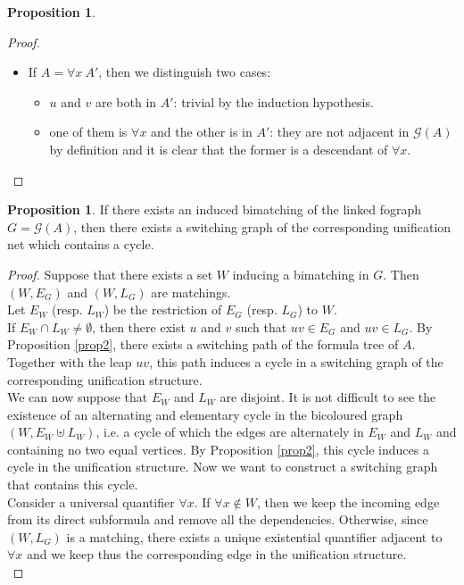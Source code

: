 \documentclass[conference,twosided,10pt]{IEEEtran}
\theoremstyle{definition}
\newtheorem{proposition}[thm]{Proposition}
\newcommand{\Gr}{\mathcal{G}}
\begin{document}
\begin{proposition}
\begin{proof}
\begin{itemize}
\begin{itemize}
    \end{itemize}
  \item If $A = \forall x \ A'$, then we distinguish two cases:
    \begin{itemize}
      \item $u$ and $v$ are both in $A'$: trivial by the induction
	      hypothesis.
      \item one of them is $\forall x$ and the other is in $A'$:
	      they are not adjacent in $\Gr(A)$ by definition and it is clear that
		    the former is a descendant of $\forall x$.
    \end{itemize}
\end{itemize}
\end{proof}
\end{proposition}

\begin{proposition}
If there exists an induced bimatching of the linked fograph $G = \Gr(A)$, then there exists a switching graph of the corresponding unification net which contains a cycle.
\begin{proof}
  Suppose that there exists a set $W$ inducing a bimatching in $G$.
  Then $(W, E_G)$ and $(W, L_G)$ are matchings.\\
  Let $E_W$ (resp. $L_W$) be the restriction of $E_G$ (resp. $L_G$) to $W$. \\
  If $E_W \cap L_W \neq \emptyset$, then there exist $u$ and $v$ such that $uv
  \in E_G$ and $uv \in L_G$. By Proposition \ref{prop2}, there exists a
  switching path of the formula tree of $A$. Together with the leap
  $uv$, this path induces a cycle in a switching graph of the
  corresponding unification structure. \\
  We can now suppose that $E_W$ and $L_W$ are disjoint. It is not difficult to
  see the existence of an alternating and elementary cycle in the bicoloured graph $(W, E_W \uplus L_W)$, i.e. a cycle of which the edges are alternately in $E_W$ and $L_W$ and containing no two equal vertices.
  By Proposition \ref{prop2}, this cycle induces a cycle in the unification
  structure. Now we want to construct a switching graph that contains this cycle.\\
  Consider a universal quantifier $\forall x$. If $\forall x \notin W$, then        
  we keep the incoming edge from its direct subformula and remove all the 
  dependencies. Otherwise, since $(W, L_G)$ is a matching, there exists a
  unique existential quantifier adjacent to $\forall x$ and we keep thus the
  corresponding edge in the unification structure. \\

\end{proof}
\end{proposition}
\end{document}
